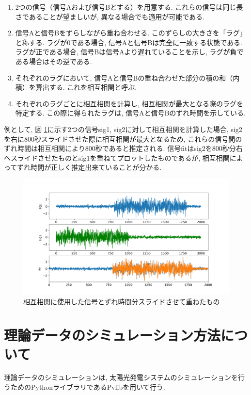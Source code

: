 \documentclass[a4j,12pt,]{jarticle}
\begin{document}
\begin{enumerate}
\item 2つの信号（信号Aおよび信号Bとする）を用意する. これらの信号は同じ長さであることが望ましいが, 異なる場合でも適用が可能である. 
\item 信号Aと信号Bをずらしながら重ね合わせる. このずらしの大きさを「ラグ」と称する. ラグが0である場合, 信号Aと信号Bは完全に一致する状態である. ラグが正である場合, 信号Bは信号Aより遅れていることを示し, ラグが負である場合はその逆である. 
\item それぞれのラグにおいて, 信号Aと信号Bの重ね合わせた部分の積の和（内積）を算出する. これを相互相関と呼ぶ. 
\item それぞれのラグごとに相互相関を計算し, 相互相関が最大となる際のラグを特定する. この際に得られたラグは, 信号Aと信号Bのずれ時間を示している. 
\end{enumerate}

例として, 図 \ref{p1}に示す2つの信号sig1, sig2に対して相互相関を計算した場合, sig2を右に800秒スライドさせた際に相互相関が最大となるため, これらの信号間のずれ時間は相互相関により800秒であると推定される. 信号fitはsig2を800秒分右へスライドさせたものとsig1を重ねてプロットしたものであるが, 相互相関によってずれ時間が正しく推定出来ていることが分かる.

\begin{figure}[H]
  \begin{center}
    \includegraphics[width=160mm]{corr_sample.png}
    \caption{相互相関に使用した信号とずれ時間分スライドさせて重ねたもの}
    \label{p1}
  \end{center}
\end{figure}

\section{理論データのシミュレーション方法について}
理論データのシミュレーションは, 太陽光発電システムのシミュレーションを行うためのPythonライブラリであるPvlibを用いて行う. 
\end{document}
